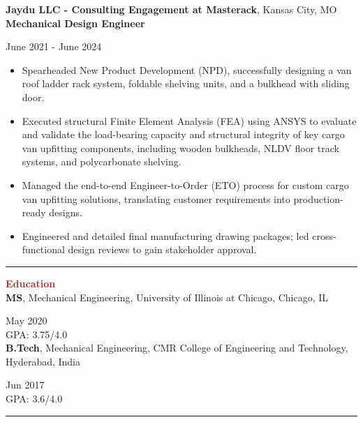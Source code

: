 \documentclass[11pt, letterpaper]{article}
\begin{document}
\textbf{Jaydu LLC - Consulting Engagement at Masterack}, Kansas City, MO\\ 
\textbf{Mechanical Design Engineer}\hfill \raggedright{June 2021 - June 2024}\\
\begin{itemize}[leftmargin=*]
\setlength\itemsep{-2pt}
\vspace{-8pt}
\item Spearheaded New Product Development (NPD), successfully designing a van roof ladder rack system, foldable shelving units, and a bulkhead with sliding door.
\item Executed structural Finite Element Analysis (FEA) using ANSYS to evaluate and validate the load-bearing capacity and structural integrity of key cargo van upfitting components, including wooden bulkheads, NLDV floor track systems, and polycarbonate shelving.
\item Managed the end-to-end Engineer-to-Order (ETO) process for custom cargo van upfitting solutions, translating customer requirements into production-ready designs.
\item Engineered and detailed final manufacturing drawing packages; led cross-functional design reviews to gain stakeholder approval.
\end{itemize}
\vspace{-8pt}
\noindent \rule[2pt]{\textwidth}{0.5pt}
\noindent \textbf{\large \textcolor{Brown}{Education}}\vspace{2pt}\\
\textbf{MS}, Mechanical Engineering, University of Illinois at Chicago, Chicago, IL \hfill \raggedright{May 2020}\\
{GPA: 3.75/4.0}\\
\vspace{6pt}
\textbf{B.Tech}, Mechanical Engineering, CMR College of Engineering and Technology, Hyderabad, India \hfill \raggedright{Jun 2017}\\
{GPA: 3.6/4.0}\\
\vspace{-2pt}
 \noindent \rule[2pt]{\textwidth}{0.5pt}
\end{document}
